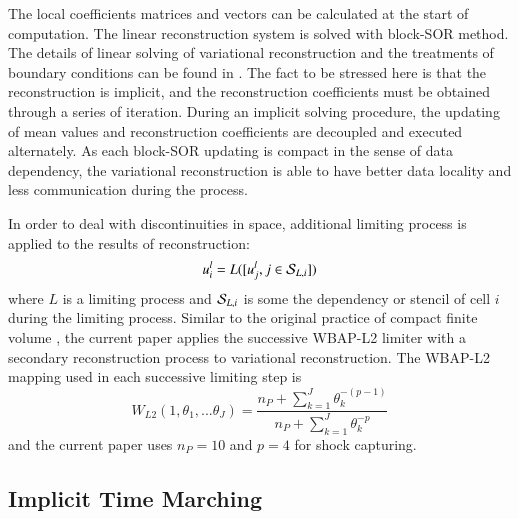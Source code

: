 \documentclass[preprint,12pt]{elsarticle}
\begin{document}
The local coefficients matrices and vectors  can be
calculated at the start of computation.
The linear reconstruction system  is solved with block-SOR method.
The details of linear solving of variational reconstruction and the treatments of
boundary conditions can be found in \cite{wang2017compact_VR}.
The fact to be stressed here is that the reconstruction is implicit, and
the reconstruction coefficients must be obtained through a series of
iteration.
During an implicit solving procedure,
the updating of mean values and reconstruction coefficients are decoupled
and executed alternately.
As each block-SOR updating is compact in the sense of data dependency,
the variational reconstruction is able to have better data locality and
less communication during the process.

In order to deal with discontinuities in space, additional limiting
process is applied to the results of reconstruction:
\begin{equation}
    u_i^l = L([u_j^l, j\in \mathcal{S}_{L,i}])
\end{equation}
where $L$ is a limiting process and $\mathcal{S}_{L,i}$ is some
the dependency or stencil of cell $i$ during the limiting process.
Similar to the original practice of compact finite volume \cite{wang2016compact1_VR},
the current paper applies the
successive WBAP-L2 limiter \cite{li2011multi,li2012multi}
with a secondary reconstruction process \cite{li2012high} to variational
reconstruction.
The WBAP-L2 mapping used in each successive limiting step
is
\begin{equation}
    W_{L2} (1,\theta_1,...\theta_J) =
    \frac{n_P + \sum_{k=1}^J\theta_k^{-(p-1)} }
    {n_P + \sum_{k=1}^J\theta_k^{-p}}
\end{equation}
and the current paper uses $n_P = 10$ and $p=4$ for shock capturing.

\subsection{Implicit Time Marching}
\end{document}
